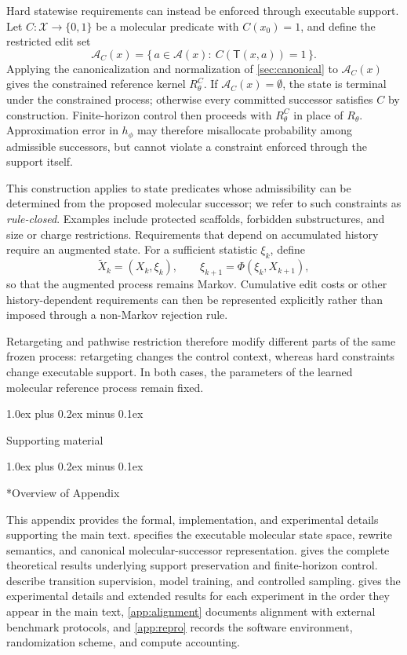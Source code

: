 \documentclass{article}
\makeatletter
\theoremstyle{definition}
\theoremstyle{remark}
\def\section{\@startsection{section}{1}{\z@}{-1.4ex plus -0.4ex minus -.2ex}%
  {1.0ex plus 0.2ex minus 0.1ex}{\large\sc\raggedright}}
\newcommand{\X}{\mathcal{X}}
\newcommand{\A}{\mathcal{A}}
\newcommand{\T}{\mathsf{T}}
\makeatother
\begin{document}
Hard statewise requirements can instead be enforced through executable support. Let $C:\X\to\{0,1\}$ be a molecular predicate with $C(x_0)=1$, and define the restricted edit set
\begin{equation}
\A_C(x)=\bigl\{\,a\in\A(x):\ C(\T(x,a))=1\,\bigr\}.
\label{eq:constrained}
\end{equation}
Applying the canonicalization and normalization of \cref{sec:canonical} to $\A_C(x)$ gives the constrained reference kernel $R^{C}_\theta$. If $\A_C(x)=\emptyset$, the state is terminal under the constrained process; otherwise every committed successor satisfies $C$ by construction. Finite-horizon control then proceeds with $R^{C}_\theta$ in place of $R_\theta$. Approximation error in $h_\phi$ may therefore misallocate probability among admissible successors, but cannot violate a constraint enforced through the support itself.

This construction applies to state predicates whose admissibility can be determined from the proposed molecular successor; we refer to such constraints as \emph{rule-closed}. Examples include protected scaffolds, forbidden substructures, and size or charge restrictions. Requirements that depend on accumulated history require an augmented state. For a sufficient statistic $\xi_k$, define
\[
\widetilde X_k=(X_k,\xi_k),\qquad \xi_{k+1}=\Phi(\xi_k,X_{k+1}),
\]
so that the augmented process remains Markov. Cumulative edit costs or other history-dependent requirements can then be represented explicitly rather than imposed through a non-Markov rejection rule.

Retargeting and pathwise restriction therefore modify different parts of the same frozen process: retargeting changes the control context, whereas hard constraints change executable support. In both cases, the parameters of the learned molecular reference process remain fixed.

\section{Supporting material}
\label{app:supporting}

\section*{Overview of Appendix}

This appendix provides the formal, implementation, and experimental details supporting the main text.  specifies the executable molecular state space, rewrite semantics, and canonical molecular-successor representation.  gives the complete theoretical results underlying support preservation and finite-horizon control.  describe transition supervision, model training, and controlled sampling.  gives the experimental details and extended results for each experiment in the order they appear in the main text, \cref{app:alignment} documents alignment with external benchmark protocols, and \cref{app:repro} records the software environment, randomization scheme, and compute accounting.
\end{document}
